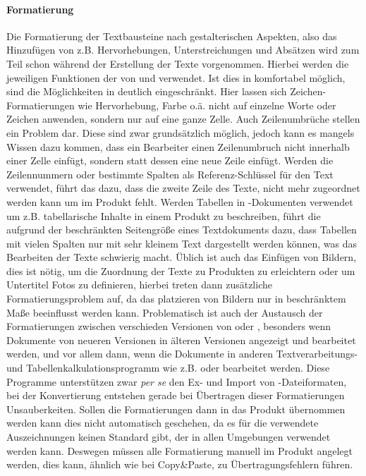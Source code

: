 \paragraph{Formatierung} Die Formatierung der Textbausteine nach gestalterischen Aspekten, also das Hinzufügen von z.B. Hervorhebungen, Unterstreichungen und Absätzen wird zum Teil schon während der Erstellung der Texte vorgenommen. Hierbei werden die jeweiligen Funktionen der von  und  verwendet. Ist dies in  komfortabel möglich, sind die Möglichkeiten in  deutlich eingeschränkt. Hier lassen sich Zeichen-Formatierungen wie Hervorhebung, Farbe o.ä. nicht auf einzelne Worte oder Zeichen anwenden, sondern nur auf eine ganze Zelle. Auch Zeilenumbrüche stellen ein Problem dar. Diese sind zwar grundsätzlich möglich, jedoch kann es mangels Wissen dazu kommen, dass ein Bearbeiter einen Zeilenumbruch nicht innerhalb einer Zelle einfügt, sondern statt dessen eine neue Zeile einfügt. Werden die Zeilennummern oder bestimmte Spalten als Referenz-Schlüssel für den Text verwendet, führt das dazu, dass die zweite Zeile des Texte, nicht mehr zugeordnet werden kann um im Produkt fehlt. Werden Tabellen in -Dokumenten verwendet um z.B. tabellarische Inhalte in einem Produkt zu beschreiben, führt die aufgrund der beschränkten Seitengröße eines Textdokuments dazu, dass Tabellen mit vielen Spalten nur mit sehr kleinem Text dargestellt werden können, was das Bearbeiten der Texte schwierig macht. Üblich ist auch das Einfügen von Bildern, dies ist nötig, um die Zuordnung der Texte zu Produkten zu erleichtern oder um Untertitel Fotos zu definieren, hierbei treten dann zusätzliche Formatierungsproblem auf, da das platzieren von Bildern nur in beschränktem Maße beeinflusst werden kann. Problematisch ist auch der Austausch der Formatierungen zwischen verschieden Versionen von  oder , besonders wenn Dokumente von neueren Versionen in älteren Versionen angezeigt und bearbeitet werden, und vor allem dann, wenn die Dokumente in anderen Textverarbeitungs- und Tabellenkalkulationsprogramm wie z.B.   oder  bearbeitet werden. Diese Programme unterstützen zwar \emph{per se} den Ex- und Import von -Dateiformaten, bei der Konvertierung entstehen gerade bei Übertragen dieser Formatierungen  Unsauberkeiten. Sollen die Formatierungen dann in das Produkt übernommen werden kann dies nicht automatisch geschehen, da es für die verwendete Auszeichnungen keinen Standard gibt, der in allen Umgebungen verwendet werden kann. Deswegen müssen alle Formatierung manuell im Produkt angelegt werden, dies kann, ähnlich wie bei Copy\&Paste, zu Übertragungsfehlern führen.

